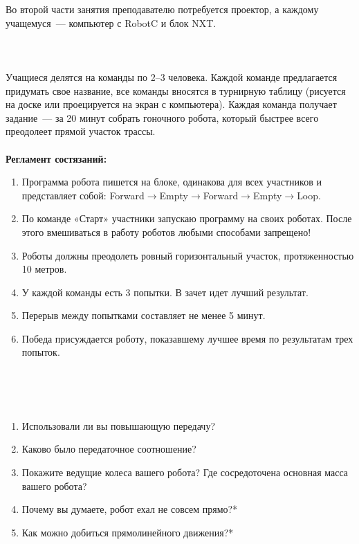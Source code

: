 Во второй части занятия преподавателю потребуется проектор, а каждому учащемуся~--- компьютер с RobotC и блок NXT.\\\\

{\hypertarget{lesson9x2}{}}\\\\

Учащиеся делятся на команды по 2--3 человека. Каждой команде предлагается придумать свое название, все команды вносятся в турнирную таблицу (рисуется на доске или проецируется на экран с компьютера).
Каждая команда получает задание~--- за 20 минут собрать гоночного робота, который быстрее всего преодолеет прямой участок трассы.\\\\
{\bfseries Регламент состязаний:}

\begin{enumerate}
	\item Программа робота пишется на блоке, одинакова для всех участников и представляет собой: Forward\(\to\)Empty\(\to\)Forward\(\to\)Empty\(\to\)Loop.
	\item По команде «Старт» участники запускаю программу на своих роботах. После этого вмешиваться в работу роботов любыми способами  запрещено!
	\item Роботы должны преодолеть ровный горизонтальный участок, протяженностью 10 метров.
	\item У каждой команды есть 3 попытки. В зачет идет лучший результат.
	\item Перерыв между попытками составляет не менее 5 минут.
	\item Победа присуждается роботу, показавшему лучшее время по результатам трех попыток.\\\\
\end{enumerate}

{\hypertarget{lesson9x3}{}}\\\\

\begin{enumerate}
	\item Использовали ли вы повышающую передачу?
	\item Каково было передаточное соотношение?
	\item Покажите ведущие колеса вашего робота? Где сосредоточена основная масса вашего робота?
	\item Почему вы думаете, робот ехал не совсем прямо?*
	\item Как можно добиться прямолинейного движения?*
\end{enumerate}

